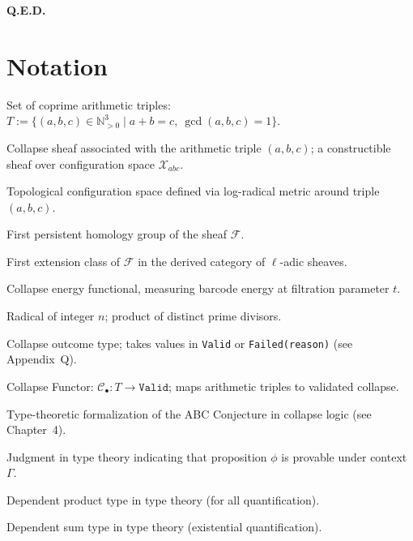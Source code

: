 \documentclass[11pt]{article}
\begin{document}
\hfill \textbf{Q.E.D.}



\section*{Notation}

\begin{description}[leftmargin=3.2cm, labelsep=0.8cm]

\item[$T$] 
Set of coprime arithmetic triples: \( T := \{ (a,b,c) \in \mathbb{N}_{>0}^3 \mid a + b = c,\ \gcd(a,b,c) = 1 \} \).

\item[$\mathcal{F}_{abc}$] 
Collapse sheaf associated with the arithmetic triple \( (a,b,c) \); a constructible sheaf over configuration space \( \mathcal{X}_{abc} \).

\item[$\mathcal{X}_{abc}$] 
Topological configuration space defined via log-radical metric around triple \( (a,b,c) \).

\item[$\mathrm{PH}_1(\mathcal{F})$] 
First persistent homology group of the sheaf \( \mathcal{F} \).

\item[$\mathrm{Ext}^1(\mathcal{F}, \mathbb{Q}_\ell)$] 
First extension class of \( \mathcal{F} \) in the derived category of \( \ell \)-adic sheaves.

\item[$E_{abc}(t)$] 
Collapse energy functional, measuring barcode energy at filtration parameter \( t \).

\item[$\mathrm{rad}(n)$] 
Radical of integer \( n \); product of distinct prime divisors.

\item[$\mathsf{CollapseStatus}(t)$] 
Collapse outcome type; takes values in \texttt{Valid} or \texttt{Failed(reason)} (see Appendix~Q).

\item[$\mathcal{C}_\bullet$] 
Collapse Functor: \( \mathcal{C}_\bullet : T \to \texttt{Valid} \); maps arithmetic triples to validated collapse.

\item[$\mathsf{ABC}_{\text{collapse}}$] 
Type-theoretic formalization of the ABC Conjecture in collapse logic (see Chapter~4).

\item[$\Gamma \vdash \phi : \mathrm{Prop}$] 
Judgment in type theory indicating that proposition \( \phi \) is provable under context \( \Gamma \).

\item[$\Pi$-type] 
Dependent product type in type theory (for all quantification).

\item[$\Sigma$-type] 
Dependent sum type in type theory (existential quantification).

\end{description}
\end{document}
